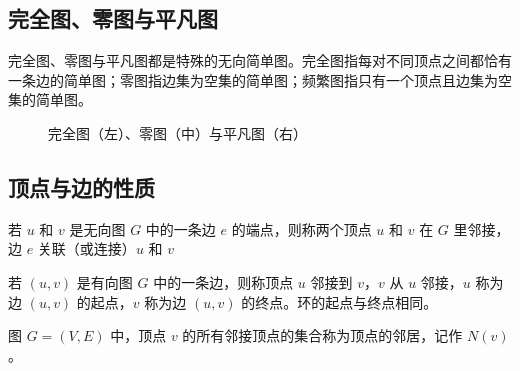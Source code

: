 \documentclass[lang=cn, chinesefont=founder, color=cyan, citestyle=gb7714-2015, bibstyle=gb7714-2015]{elegantbook}
\begin{document}
\subsection{完全图、零图与平凡图}
完全图、零图与平凡图都是特殊的无向简单图。完全图指每对不同顶点之间都恰有一条边的简单图；零图指边集为空集的简单图；频繁图指只有一个顶点且边集为空集的简单图。
\begin{figure}[H]
    \centering
    \hspace{3em}
    \hspace{3em}
    \caption{完全图（左）、零图（中）与平凡图（右）}
    \label{完全图、零图与平凡图}
\end{figure}

\subsection{顶点与边的性质}
\begin{definition}[无向图顶点的邻接]\label{def:无向图邻接}
    若 $u$ 和 $v$ 是无向图 $G$ 中的一条边 $e$ 的端点，则称两个顶点 $u$ 和 $v$ 在 $G$ 里邻接，边 $e$ 关联（或连接）$u$ 和 $v$
\end{definition}
\begin{definition}[有向图顶点的邻接]\label{def:有向图邻接}
    若 $(u,v)$ 是有向图 $G$ 中的一条边，则称顶点 $u$ 邻接到 $v$，$v$ 从 $u$ 邻接，$u$ 称为边 $(u,v)$ 的起点，$v$ 称为边 $(u,v)$ 的终点。环的起点与终点相同。
\end{definition}
\begin{definition}[顶点的邻居]\label{def:邻居}
    图 $G=(V, E)$ 中，顶点 $v$ 的所有邻接顶点的集合称为顶点的邻居，记作 $N(v)$。
\end{definition}
\end{document}
